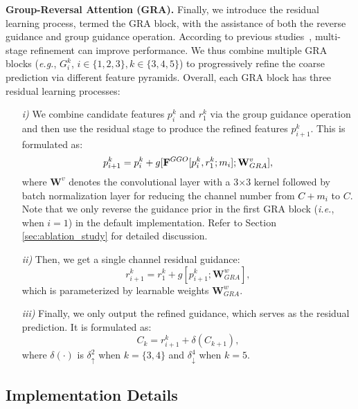 \documentclass[10pt,journal,compsoc]{IEEEtran}
\def\ie{\emph{i.e.}}
\def\eg{\emph{e.g.}}
\newcommand{\myPara}[1]{\vspace{6pt}\noindent\textbf{#1}\qquad }
\newcommand{\secref}[1]{Section \ref{#1}}
\newcommand{\Rev}[1]{\textcolor{black}{#1}}
\begin{document}
\myPara{Group-Reversal Attention (GRA).}
%
Finally, we introduce the residual learning process, termed the GRA block, 
with the assistance of both the reverse guidance and group guidance operation.
%
According to previous studies~\cite{qin2019basnet,xu2017deep}, 
multi-stage refinement can improve performance.
%
We thus combine multiple GRA blocks 
(\eg, $G^k_i$, $i \in \{ 1, 2, 3 \}, k \in \{3,4,5\}$) to progressively 
refine the coarse prediction via different feature pyramids.
%
Overall, each GRA block has three residual learning processes:
%
\begin{enumerate}
%
\item [\textit{i)}] We combine candidate features $p_i^k$ and $r_1^k$ 
  via the group guidance operation and then use the residual stage 
  to produce the refined features $p_{i+1}^k$. 
  This is formulated as:
  \begin{equation}
    p_{i+1}^k = 
    p_i^k + g[\mathbf{F}^{GGO}[p_i^k, r_1^k; \Rev{m_i}];\mathbf{W}^v_{GRA}],
  \end{equation}
  where $\mathbf{W}^v$ denotes the convolutional layer with a 3$\times$3 
  kernel followed by batch normalization layer 
  for reducing the channel number from \Rev{$C+m_i$} to $C$. 
  Note that we only reverse the guidance prior in the first GRA block 
  (\ie, when $i=1$) in the default implementation. 
  Refer to \secref{sec:ablation_study} for detailed discussion.
    
\item [\textit{ii)}] Then, we get a single channel residual guidance:
  \begin{equation}
    r_{i+1}^k = r_1^k + g[p_{i+1}^k;\mathbf{W}^w_{GRA}],
  \end{equation}
  which is parameterized by learnable weights $\mathbf{W}^w_{GRA}$.
  
\item [\textit{iii)}] Finally, we only output the refined guidance, 
  which serves as the residual prediction. It is formulated as:
  \begin{equation}
    C_{k} = r_{i+1}^k + \delta(C_{k+1}),
  \end{equation}
  where $\delta(\cdot)$ is $\delta^2_{\uparrow}$ when $k=\{3,4\}$ 
  and $\delta^4_{\downarrow}$ when $k=5$.

\end{enumerate}




\subsection{Implementation Details}\label{sec:implementation_details}
\end{document}
